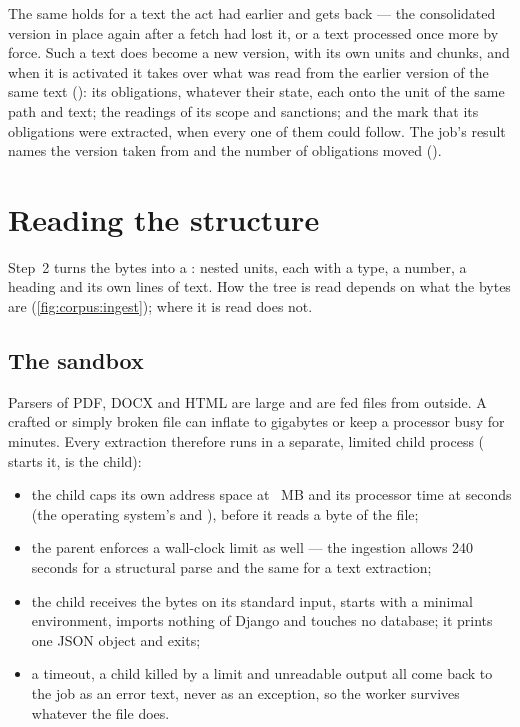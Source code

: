 The same holds for a text the act had earlier and gets back --- the consolidated version in
place again after a fetch had lost it, or a text processed once more by force. Such a text
does become a new version, with its own units and chunks, and when it is activated it takes
over what was read from the earlier version of the same text (): its
obligations, whatever their state, each onto the unit of the same path and text; the readings
of its scope and sanctions; and the mark that its obligations were extracted, when every one
of them could follow. The job's result names the version taken from and the number of
obligations moved ().


\section{Reading the structure}\label{sec:corpus:parse}

Step~2 turns the bytes into a : nested units, each with a type, a
number, a heading and its own lines of text. How the tree is read depends on what the bytes
are (\cref{fig:corpus:ingest}); where it is read does not.

\subsection{The sandbox}\label{sec:corpus:sandbox}

Parsers of PDF, DOCX and HTML are large and are fed files from outside. A crafted or simply
broken file can inflate to gigabytes or keep a processor busy for minutes. Every extraction
therefore runs in a separate, limited child process ( starts it,
 is the child):

\begin{itemize}
  \item the child caps its own address space at ~MB and its
    processor time at  seconds (the operating system's
     and ), before it reads a byte of the file;
  \item the parent enforces a wall-clock limit as well --- the ingestion allows 240 seconds
    for a structural parse and the same for a text extraction;
  \item the child receives the bytes on its standard input, starts with a minimal environment,
    imports nothing of Django and touches no database; it prints one JSON object and exits;
  \item a timeout, a child killed by a limit and unreadable output all come back to the job
    as an error text, never as an exception, so the worker survives whatever the file does.
\end{itemize}

